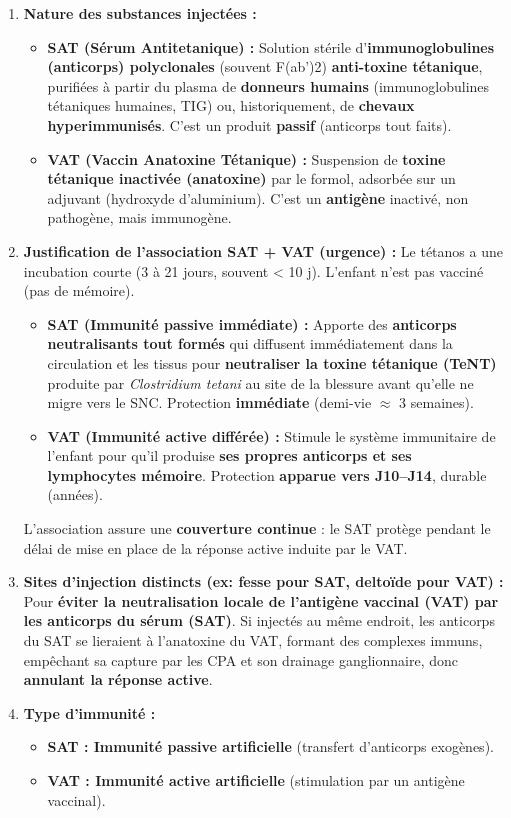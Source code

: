 \documentclass[11pt]{article}
\begin{document}
\begin{corrige}
\begin{enumerate}
    \item \textbf{Nature des substances injectées :}
    \begin{itemize}
        \item \textbf{SAT (Sérum Antitetanique) :} Solution stérile d'\textbf{immunoglobulines (anticorps) polyclonales} (souvent F(ab')2) \textbf{anti-toxine tétanique}, purifiées à partir du plasma de \textbf{donneurs humains} (immunoglobulines tétaniques humaines, TIG) ou, historiquement, de \textbf{chevaux hyperimmunisés}. C'est un produit \textbf{passif} (anticorps tout faits).
        \item \textbf{VAT (Vaccin Anatoxine Tétanique) :} Suspension de \textbf{toxine tétanique inactivée (anatoxine)} par le formol, adsorbée sur un adjuvant (hydroxyde d'aluminium). C'est un \textbf{antigène} inactivé, non pathogène, mais immunogène.
    \end{itemize}
    \item \textbf{Justification de l'association SAT + VAT (urgence) :}
    Le tétanos a une incubation courte (3 à 21 jours, souvent < 10 j). L'enfant n'est pas vacciné (pas de mémoire).
    \begin{itemize}
        \item \textbf{SAT (Immunité passive immédiate) :} Apporte des \textbf{anticorps neutralisants tout formés} qui diffusent immédiatement dans la circulation et les tissus pour \textbf{neutraliser la toxine tétanique (TeNT)} produite par \emph{Clostridium tetani} au site de la blessure avant qu'elle ne migre vers le SNC. Protection \textbf{immédiate} (demi-vie $\approx$ 3 semaines).
        \item \textbf{VAT (Immunité active différée) :} Stimule le système immunitaire de l'enfant pour qu'il produise \textbf{ses propres anticorps et ses lymphocytes mémoire}. Protection \textbf{apparue vers J10--J14}, durable (années).
    \end{itemize}
    L'association assure une \textbf{couverture continue} : le SAT protège pendant le délai de mise en place de la réponse active induite par le VAT.
    \item \textbf{Sites d'injection distincts (ex: fesse pour SAT, deltoïde pour VAT) :}
    Pour \textbf{éviter la neutralisation locale de l'antigène vaccinal (VAT) par les anticorps du sérum (SAT)}. Si injectés au même endroit, les anticorps du SAT se lieraient à l'anatoxine du VAT, formant des complexes immuns, empêchant sa capture par les CPA et son drainage ganglionnaire, donc \textbf{annulant la réponse active}.
    \item \textbf{Type d'immunité :}
    \begin{itemize}
        \item \textbf{SAT : Immunité \textbf{passive artificielle}} (transfert d'anticorps exogènes).
        \item \textbf{VAT : Immunité \textbf{active artificielle}} (stimulation par un antigène vaccinal).
    \end{itemize}
\end{enumerate}
\end{corrige}
\end{document}
